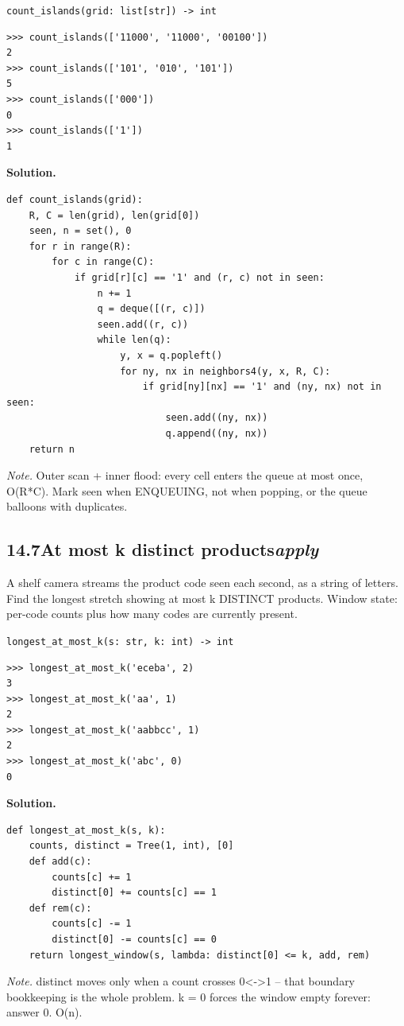 \documentclass[10pt,letterpaper]{book}
\begin{document}
\noindent\texttt{count\_islands(grid: list[str]) -> int}
\begin{lstlisting}[style=ex]
>>> count_islands(['11000', '11000', '00100'])
2
>>> count_islands(['101', '010', '101'])
5
>>> count_islands(['000'])
0
>>> count_islands(['1'])
1
\end{lstlisting}
\noindent\textbf{Solution.}
\begin{lstlisting}[style=code]
def count_islands(grid):
    R, C = len(grid), len(grid[0])
    seen, n = set(), 0
    for r in range(R):
        for c in range(C):
            if grid[r][c] == '1' and (r, c) not in seen:
                n += 1
                q = deque([(r, c)])
                seen.add((r, c))
                while len(q):
                    y, x = q.popleft()
                    for ny, nx in neighbors4(y, x, R, C):
                        if grid[ny][nx] == '1' and (ny, nx) not in seen:
                            seen.add((ny, nx))
                            q.append((ny, nx))
    return n
\end{lstlisting}
\noindent\textit{Note.} Outer scan + inner flood: every cell enters the queue at most once, O(R*C). Mark seen when ENQUEUING, not when popping, or the queue balloons with duplicates.

\subsection*{14.7\quad At most k distinct products\hfill\textnormal{\textit{apply}}}
A shelf camera streams the product code seen each second, as a string of letters. Find the longest stretch showing at most k DISTINCT products. Window state: per-code counts plus how many codes are currently present.

\noindent\texttt{longest\_at\_most\_k(s: str, k: int) -> int}
\begin{lstlisting}[style=ex]
>>> longest_at_most_k('eceba', 2)
3
>>> longest_at_most_k('aa', 1)
2
>>> longest_at_most_k('aabbcc', 1)
2
>>> longest_at_most_k('abc', 0)
0
\end{lstlisting}
\noindent\textbf{Solution.}
\begin{lstlisting}[style=code]
def longest_at_most_k(s, k):
    counts, distinct = Tree(1, int), [0]
    def add(c):
        counts[c] += 1
        distinct[0] += counts[c] == 1
    def rem(c):
        counts[c] -= 1
        distinct[0] -= counts[c] == 0
    return longest_window(s, lambda: distinct[0] <= k, add, rem)
\end{lstlisting}
\noindent\textit{Note.} distinct moves only when a count crosses 0<->1 -- that boundary bookkeeping is the whole problem. k = 0 forces the window empty forever: answer 0. O(n).
\end{document}
